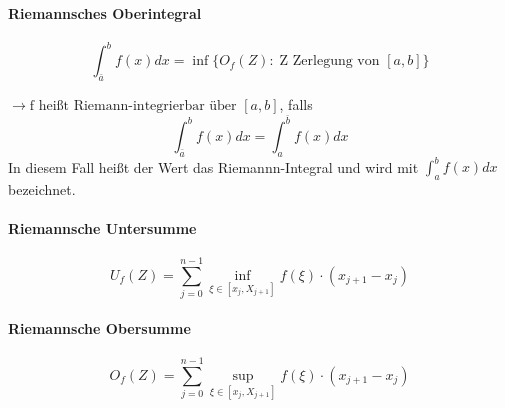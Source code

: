 \documentclass[12pt,a4paper]{report}%
\numberwithin{equation}{section}
\newcommand{\subsubsubsection}{\paragraph}
\numberwithin{equation}{subsection}
\begin{document}
\subsubsubsection{Riemannsches Oberintegral}
\begin{equation}
\int_{\bar{a}}^{b} f(x) dx = \inf\{O_f(Z): \; \text{Z Zerlegung von }[a,b]\}
\end{equation}

$\rightarrow \text{f heißt Riemann-integrierbar über }[a,b]$, falls
\begin{equation}
\int_{\bar{a}}^{b} f(x) dx = \int_a^{\bar{b}} f(x) dx
\end{equation}
\newline
In diesem Fall heißt der Wert das Riemannn-Integral und wird mit $\int_a^b f(x)dx$ bezeichnet.

\subsubsubsection{Riemannsche Untersumme}
\begin{equation}
  U_f(Z) = \sum_{j = 0}^{n-1} \inf\limits_{\xi \in [x_j, X_{j+1}]} f(\xi) \cdot (x_{j+1} -x_j)
\end{equation}
\subsubsubsection{Riemannsche Obersumme}
\begin{equation}
  O_f(Z) = \sum_{j = 0}^{n-1} \sup\limits_{\xi \in [x_j, X_{j+1}]} f(\xi) \cdot (x_{j+1} -x_j)
\end{equation}
\end{document}
